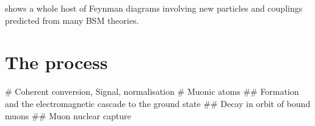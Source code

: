 shows a whole host of Feynman diagrams involving new particles and couplings predicted from many BSM theories.

\section{The \mueconv process}
\begin{easylist}
  # Coherent conversion, Signal, normalisation
  # Muonic atoms
  ## Formation and the electromagnetic cascade to the ground state
  ## Decay in orbit of bound muons
  ## Muon nuclear capture
\end{easylist}
